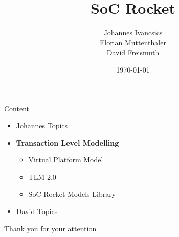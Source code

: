 \documentclass{beamer}
\title[SoC Rocket]{SoC Rocket}
\author{Johannes Ivancsics\\Florian Muttenthaler\\David Freismuth}
\institute[TU Wien]{TU Wien, Vienna, Austria}
\date{\today}
\begin{document}
\begin{frame}
  \titlepage
\end{frame}      


%
%

\begin{frame}{Content}
\begin{itemize}
\item Johannes Topics
\item \textbf{Transaction Level Modelling}
\begin{itemize}
\item Virtual Platform Model
\item TLM 2.0
\item SoC Rocket Models Library
\end{itemize}
\item David Topics
\end{itemize}

\end{frame}





\begin{frame}{}
  \centering\Huge
  Thank you for your attention
\end{frame}

%
%

%
\end{document}
